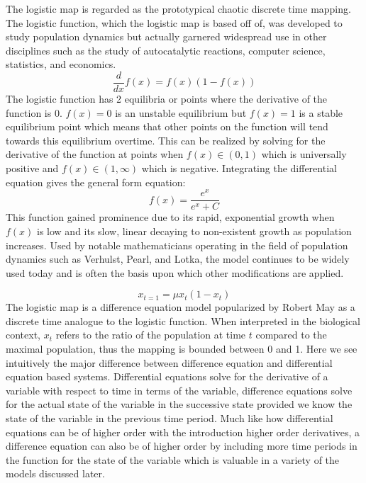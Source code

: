 The logistic map is regarded as the prototypical chaotic discrete time mapping. The logistic function, which the logistic map is based off of, was developed to study population dynamics but actually garnered widespread use in other disciplines such as the study of autocatalytic reactions, computer science, statistics, and economics\autocite{Kavanagh1934}.
\begin{equation}
    \frac{d}{dx}f(x)=f(x)(1-f(x))
\end{equation}
The logistic function has 2 equilibria or points where the derivative of the function is 0. $f(x) = 0$ is an unstable equilibrium but $f(x)=1$ is a stable equilibrium point which means that other points on the function will tend towards this equilibrium overtime.  This can be realized by solving for the derivative of the function at points when $f(x)\in(0,1)$ which is universally positive and $f(x)\in(1,\infty)$ which is negative. Integrating the differential equation gives the general form equation:
\begin{equation}
    f(x)=\frac{e^x}{e^x+C}
\end{equation}
This function gained prominence due to its rapid, exponential growth when $f(x)$ is low and its slow, linear decaying to non-existent growth as population increases.  Used by notable mathematicians operating in the field of population dynamics such as Verhulst, Pearl, and Lotka, the model continues to be widely used today and is often the basis upon which other modifications are applied\autocite{Zwanzig1973}.

\begin{equation}
    x_{t=1}=\mu x_t(1-x_t)
\end{equation}
The logistic map is a difference equation model popularized by Robert May as a discrete time analogue to the logistic function\autocite{May1976}. When interpreted in the biological context, $x_t$ refers to the ratio of the population at time $t$ compared to the maximal population, thus the mapping is bounded between 0 and 1. Here we see intuitively the major difference between difference equation and differential equation based systems. Differential equations solve for the derivative of a variable with respect to time in terms of the variable, difference equations solve for the actual state of the variable in the successive state provided we know the state of the variable in the previous time period. Much like how differential equations can be of higher order with the introduction higher order derivatives, a difference equation can also be of higher order by including more time periods in the function for the state of the variable which is valuable in a variety of the models discussed later.

